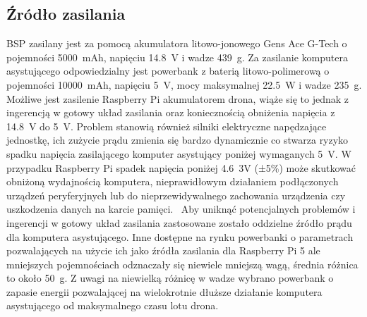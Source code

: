 \documentclass[a4paper,12pt]{book}
\begin{document}
        \subsection{Źródło zasilania}
        BSP zasilany jest za pomocą akumulatora litowo-jonowego Gens Ace G-Tech o pojemności 5000~mAh, napięciu 14.8~V i wadze 439~g. Za zasilanie komputera asystującego odpowiedzialny jest powerbank z baterią litowo-polimerową
         o pojemności 10000~mAh, napięciu 5~V, mocy maksymalnej 22.5~W i wadze 235~g. Możliwe jest zasilenie Raspberry Pi akumulatorem drona, wiąże się to jednak z ingerencją w gotowy układ zasilania oraz koniecznością obniżenia napięcia z 14.8~V do 5~V. Problem 
         stanowią również silniki elektryczne napędzające jednostkę, ich zużycie prądu zmienia się bardzo dynamicznie co stwarza ryzyko spadku napięcia zasilającego komputer asystujący poniżej wymaganych 5~V. W przypadku Raspberry Pi 
        spadek napięcia poniżej 4.6~3V (±5\%) może skutkować obniżoną wydajnością komputera, nieprawidłowym działaniem podłączonych urządzeń peryferyjnych lub do nieprzewidywalnego zachowania urządzenia czy uszkodzenia danych na karcie pamięci.~\cite{web:raspberry:pi:documentation:power:supply} 
        Aby uniknąć potencjalnych problemów i ingerencji w gotowy układ zasilania zastosowane zostało oddzielne źródło prądu dla komputera asystującego. Inne dostępne na rynku powerbanki o parametrach pozwalających na użycie ich jako źródła zasilania dla Raspberry Pi 5 ale mniejszych pojemnościach 
        odznaczały się niewiele mniejszą wagą, średnia różnica to około 50~g. Z uwagi na niewielką różnicę w wadze wybrano powerbank o zapasie energii pozwalającej na wielokrotnie dłuższe działanie komputera asystującego od maksymalnego czasu lotu drona.
\end{document}
